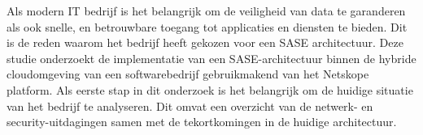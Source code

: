 




Als modern IT bedrijf is het belangrijk om de veiligheid van data te garanderen als ook snelle, en betrouwbare toegang tot applicaties en diensten te bieden. Dit is de reden waarom het bedrijf heeft gekozen voor een SASE architectuur. Deze studie onderzoekt de implementatie van een SASE-architectuur binnen de hybride cloudomgeving van een softwarebedrijf gebruikmakend van het Netskope platform. Als eerste stap in dit onderzoek is het belangrijk om de huidige situatie van het bedrijf te analyseren. Dit omvat een overzicht van de netwerk- en security-uitdagingen samen met de tekortkomingen in de huidige architectuur.

